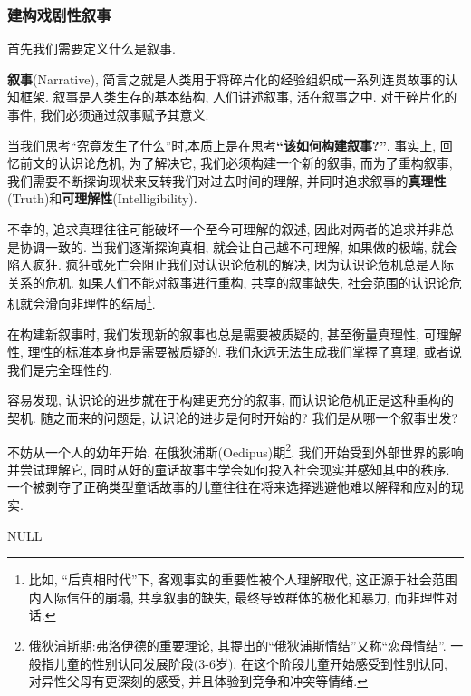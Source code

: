 \documentclass[12pt, a4paper, oneside]{ctexart}
\renewcommand{\b}{\textbf}
\newcommand{\f}{\footnote}
\newcommand{\q}[1]{\begin{questionbox}{}#1\end{questionbox}}
\newcommand{\ans}[1]{\begin{ansbox}{}#1\end{ansbox}}
\newcounter{question}[section]
\newcounter{ans}[section]
\begin{document}
\subsubsection{建构戏剧性叙事}

首先我们需要定义什么是叙事.

\b{叙事}(Narrative), 简言之就是人类用于将碎片化的经验组织成一系列连贯故事的认知框架. 叙事是人类生存的基本结构, 人们讲述叙事, 活在叙事之中. 对于碎片化的事件, 我们必须通过叙事赋予其意义. 

当我们思考``究竟发生了什么''时,本质上是在思考\b{``该如何构建叙事?''}. 事实上, 回忆前文的认识论危机, 为了解决它, 我们必须构建一个新的叙事, 而为了重构叙事, 我们需要不断探询现状来反转我们对过去时间的理解, 并同时追求叙事的\b{真理性}(Truth)和\b{可理解性}(Intelligibility).

不幸的, 追求真理往往可能破坏一个至今可理解的叙述, 因此对两者的追求并非总是协调一致的. 当我们逐渐探询真相, 就会让自己越不可理解, 如果做的极端, 就会陷入疯狂. 疯狂或死亡会阻止我们对认识论危机的解决, 因为认识论危机总是人际关系的危机. 如果人们不能对叙事进行重构, 共享的叙事缺失, 社会范围的认识论危机就会滑向非理性的结局\f{比如, ``后真相时代''下, 客观事实的重要性被个人理解取代, 这正源于社会范围内人际信任的崩塌, 共享叙事的缺失, 最终导致群体的极化和暴力, 而非理性对话. }. 

在构建新叙事时, 我们发现新的叙事也总是需要被质疑的, 甚至衡量真理性, 可理解性, 理性的标准本身也是需要被质疑的. 我们永远无法生成我们掌握了真理, 或者说我们是完全理性的.

容易发现, 认识论的进步就在于构建更充分的叙事, 而认识论危机正是这种重构的契机. 随之而来的问题是, 认识论的进步是何时开始的? 我们是从哪一个叙事出发?

不妨从一个人的幼年开始. 在俄狄浦斯(Oedipus)期\f{俄狄浦斯期:弗洛伊德的重要理论, 其提出的``俄狄浦斯情结''又称``恋母情结''. 一般指儿童的性别认同发展阶段(3-6岁), 在这个阶段儿童开始感受到性别认同, 对异性父母有更深刻的感受, 并且体验到竞争和冲突等情绪. }, 我们开始受到外部世界的影响并尝试理解它, 同时从好的童话故事中学会如何投入社会现实并感知其中的秩序. 一个被剥夺了正确类型童话故事的儿童往往在将来选择逃避他难以解释和应对的现实.



\q{}
\ans{NULL}

\end{document}
